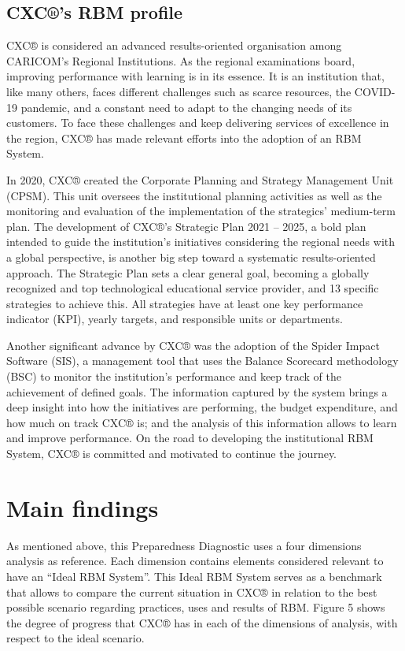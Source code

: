 \documentclass[
  10pt,
]{book}
\begin{document}
\hypertarget{cxcs-rbm-profile}{%
\section{CXC®'s RBM profile}\label{cxcs-rbm-profile}}

CXC® is considered an advanced results-oriented organisation among CARICOM's Regional Institutions. As the regional examinations board, improving performance with learning is in its essence. It is an institution that, like many others, faces different challenges such as scarce resources, the COVID-19 pandemic, and a constant need to adapt to the changing needs of its customers. To face these challenges and keep delivering services of excellence in the region, CXC® has made relevant efforts into the adoption of an RBM System.

In 2020, CXC® created the Corporate Planning and Strategy Management Unit (CPSM). This unit oversees the institutional planning activities as well as the monitoring and evaluation of the implementation of the strategics' medium-term plan. The development of CXC®'s Strategic Plan 2021 -- 2025, a bold plan intended to guide the institution's initiatives considering the regional needs with a global perspective, is another big step toward a systematic results-oriented approach. The Strategic Plan sets a clear general goal, becoming a globally recognized and top technological educational service provider, and 13 specific strategies to achieve this. All strategies have at least one key performance indicator (KPI), yearly targets, and responsible units or departments.

Another significant advance by CXC® was the adoption of the Spider Impact Software (SIS), a management tool that uses the Balance Scorecard methodology (BSC) to monitor the institution's performance and keep track of the achievement of defined goals. The information captured by the system brings a deep insight into how the initiatives are performing, the budget expenditure, and how much on track CXC® is; and the analysis of this information allows to learn and improve performance. On the road to developing the institutional RBM System, CXC® is committed and motivated to continue the journey.

\hypertarget{section5}{%
\chapter{Main findings}\label{section5}}

As mentioned above, this Preparedness Diagnostic uses a four dimensions analysis as reference. Each dimension contains elements considered relevant to have an ``Ideal RBM System''. This Ideal RBM System serves as a benchmark that allows to compare the current situation in CXC® in relation to the best possible scenario regarding practices, uses and results of RBM. Figure 5 shows the degree of progress that CXC® has in each of the dimensions of analysis, with respect to the ideal scenario.
\end{document}
